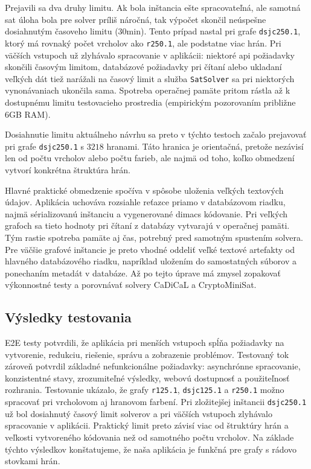 Prejavili sa dva druhy limitu. Ak bola inštancia ešte spracovateľná, ale samotná \acrshort{sat} úloha bola pre solver príliš náročná, tak výpočet skončil neúspešne dosiahnutým časoveho limitu (30min). Tento prípad nastal pri grafe \texttt{dsjc250.1}, ktorý má rovnaký počet vrcholov ako \texttt{r250.1}, ale podstatne viac hrán. Pri väčších vstupoch už zlyhávalo spracovanie v aplikácii: niektoré \acrshort{api} požiadavky skončili časovým limitom, databázové požiadavky pri čítaní alebo ukladaní veľkých dát tiež narážali na časový limit a služba \texttt{SatSolver} sa pri niektorých vynonávaniach ukončila sama. Spotreba operačnej pamäte pritom rástla až k dostupnému limitu testovacieho prostredia (empirickým pozorovaním približne 6GB RAM).

Dosiahnutie limitu aktuálneho návrhu sa preto v týchto testoch začalo prejavovať pri grafe \texttt{dsjc250.1} s $3218$ hranami. Táto hranica je orientačná, pretože nezávisí len od počtu vrcholov alebo počtu farieb, ale najmä od toho, koľko obmedzení vytvorí konkrétna štruktúra hrán.

Hlavné praktické obmedzenie spočíva v spôsobe uloženia veľkých textových údajov. Aplikácia uchováva rozsiahle reťazce priamo v databázovom riadku, najmä sérializovanú inštanciu a vygenerované \acrshort{dimacs} kódovanie. Pri veľkých grafoch sa tieto hodnoty pri čítaní z databázy vytvarajú v operačnej pamäti. Tým rastie spotreba pamäte aj čas, potrebný pred samotným spustením solvera. Pre väčšie grafové inštancie je preto vhodné oddeliť veľké textové artefakty od hlavného databázového riadku, napríklad uložením do samostatných súborov a ponechaním metadát v databáze. Až po tejto úprave má zmysel zopakovať výkonnostné testy a porovnávať solvery CaDiCaL a CryptoMiniSat.

\subsection{Výsledky testovania}\label{sec:testing:results}
E2E testy potvrdili, že aplikácia pri menších vstupoch spĺňa požiadavky na vytvorenie, redukciu, riešenie, správu a zobrazenie problémov. Testovaný tok zároveň potvrdil základné nefunkcionálne požiadavky: asynchrónne spracovanie, konzistentné stavy, zrozumiteľné výsledky, webovú dostupnosť a použiteľnosť rozhrania. Testovanie ukázalo, že grafy \texttt{r125.1}, \texttt{dsjc125.1} a \texttt{r250.1} možno spracovať pri vrcholovom aj hranovom farbení. Pri zložitejšej inštancii \texttt{dsjc250.1} už bol dosiahnutý časový limit solverov a pri väčších vstupoch zlyhávalo spracovanie v aplikácii. Praktický limit preto závisí viac od štruktúry hrán a veľkosti vytvoreného kódovania než od samotného počtu vrcholov. Na základe týchto výsledkov konštatujeme, že naša aplikácia je funkčná pre grafy s rádovo stovkami hrán.
